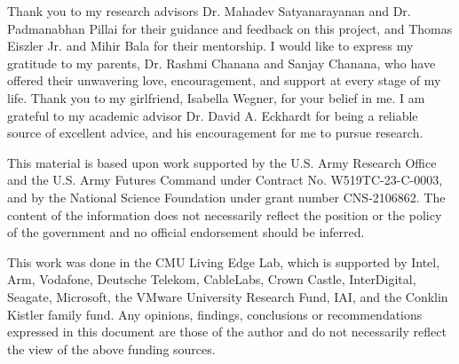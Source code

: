\documentclass[12pt]{cmuthesis}
\begin{document}
\begin{acknowledgments}

    Thank you to my research advisors Dr. Mahadev Satyanarayanan and Dr.
    Padmanabhan Pillai for their guidance and feedback on this project, and
    Thomas Eiszler Jr.  and Mihir Bala for their mentorship.  I would like to
    express my gratitude to my parents, Dr. Rashmi Chanana and Sanjay Chanana,
    who have offered their unwavering love, encouragement, and support at every
    stage of my life.  Thank you to my girlfriend, Isabella Wegner, for your
    belief in me.  I am grateful to my academic advisor Dr. David A. Eckhardt
    for being a reliable source of excellent advice, and his encouragement for
    me to pursue research.

    This material is based upon work supported by the U.S. Army Research Office
    and the U.S. Army Futures Command under Contract No. W519TC-23-C-0003, and
    by the National Science Foundation under grant number CNS-2106862. The
    content of the  information does not necessarily reflect the position or
    the policy of the government and no official endorsement should be
    inferred.

    This work was done in the CMU Living Edge Lab, which is
    supported by Intel, Arm, Vodafone, Deutsche Telekom, CableLabs, Crown
    Castle, InterDigital, Seagate, Microsoft, the VMware University Research
    Fund, IAI, and the Conklin Kistler family fund. Any opinions, findings,
    conclusions or recommendations expressed in this document are those of the
    author and do not necessarily reflect the view of the above funding
    sources.
\end{acknowledgments}


\tableofcontents
\listoffigures

\listoftables
{}

\mainmatter


%
%
%
%
%
\end{document}
